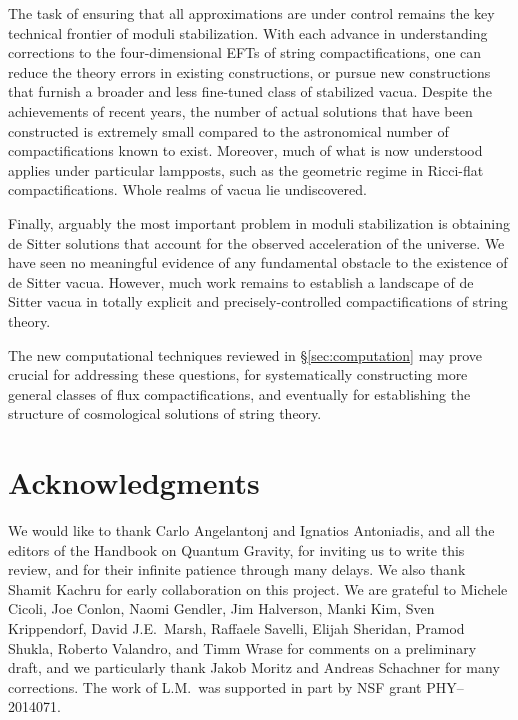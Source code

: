 \documentclass[12pt,a4wide]{article}
\begin{document}
The task of ensuring that all approximations are under control remains the key technical frontier of moduli stabilization.  With each advance in understanding corrections to the four-dimensional EFTs of string compactifications, one can reduce the theory errors in existing constructions, or pursue new constructions that furnish a broader and less fine-tuned class of stabilized vacua.  
Despite the achievements of recent years, the number of actual solutions that have been constructed is extremely small compared to the astronomical number of compactifications known to exist. 
Moreover, much of what is now understood applies under particular lampposts, such as the geometric regime in Ricci-flat compactifications.
Whole realms of vacua lie undiscovered.


Finally, arguably the most important problem in moduli stabilization is obtaining de Sitter solutions that account for the observed acceleration of the universe.  
We have seen no meaningful evidence of any  
fundamental obstacle to the existence of de Sitter vacua.
However, much work remains to establish a landscape of de Sitter vacua in 
totally explicit and precisely-controlled compactifications of string theory.


The new computational techniques reviewed in \S\ref{sec:computation} may prove crucial for addressing these questions, for systematically constructing more general classes of flux compactifications, and eventually for establishing the structure of cosmological solutions of string theory.

\section*{Acknowledgments}
We would like to thank Carlo Angelantonj and Ignatios Antoniadis, and all the editors of the Handbook on Quantum Gravity, for inviting us to write this review, and for their infinite patience through many delays. We also thank Shamit Kachru for early collaboration on this project.
We are grateful to Michele Cicoli, Joe Conlon, Naomi Gendler, Jim Halverson, Manki Kim, Sven Krippendorf,  David J.E.~Marsh, Raffaele Savelli, Elijah Sheridan, Pramod Shukla, Roberto Valandro, and Timm Wrase for comments on a preliminary draft, and we particularly thank Jakob Moritz and Andreas Schachner for many corrections.  The work of L.M.~was supported in part by NSF grant PHY–2014071.



\end{document}
